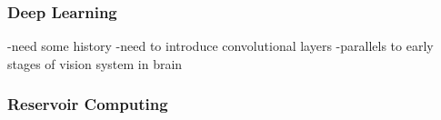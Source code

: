 \subsubsection{Deep Learning}
-need some history
-need to introduce convolutional layers
-parallels to early stages of vision system in brain



\subsubsection{Reservoir Computing}

\cite{jaha2004}

\cite{mana2002}
